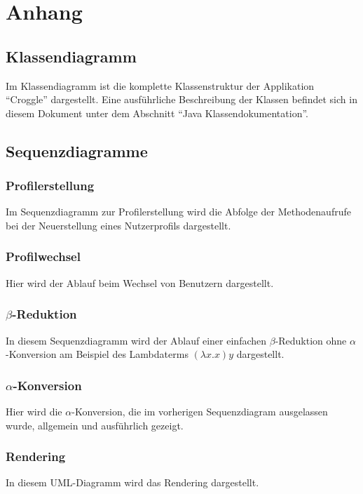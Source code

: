 \chapter{Anhang}
\section{Klassendiagramm}
	Im Klassendiagramm ist die komplette Klassenstruktur der Applikation "`Croggle"' dargestellt. 
	Eine ausführliche Beschreibung der Klassen befindet sich in diesem Dokument unter dem Abschnitt "`Java Klassendokumentation"'. 

\section{Sequenzdiagramme}
	\subsection{Profilerstellung}
		Im Sequenzdiagramm zur Profilerstellung wird die Abfolge der Methodenaufrufe bei der Neuerstellung eines Nutzerprofils dargestellt.

	\subsection{Profilwechsel}
		Hier wird der Ablauf beim Wechsel von Benutzern dargestellt.

	\subsection{\(\beta\)-Reduktion}
		In diesem Sequenzdiagramm wird der Ablauf einer einfachen \(\beta\)-Reduktion ohne \(\alpha\)-Konversion am Beispiel des Lambdaterms \((\lambda x.x) y\) dargestellt.

	\subsection{\(\alpha\)-Konversion}
		Hier wird die \(\alpha\)-Konversion, die im vorherigen Sequenzdiagram ausgelassen wurde, allgemein und ausführlich gezeigt.  

	\subsection{Rendering}
		In diesem UML-Diagramm wird das Rendering dargestellt.
